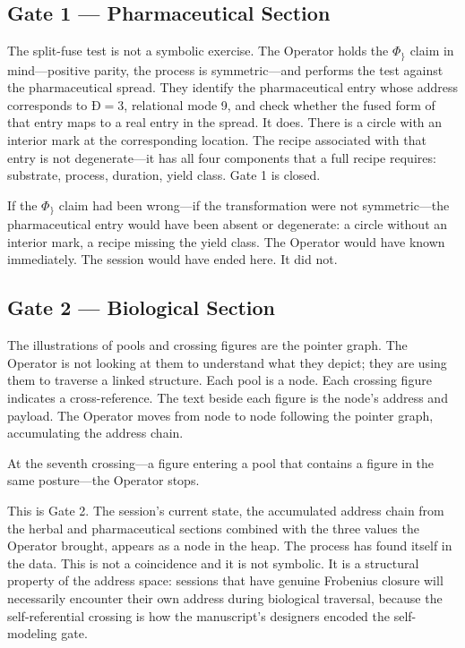 \documentclass[12pt,a4paper]{article}
\begin{document}
\subsection*{Gate 1 --- Pharmaceutical Section}

The split-fuse test is not a symbolic exercise. The Operator holds the $\Phi_\}$ claim in mind---positive parity, the process is symmetric---and performs the test against the pharmaceutical spread. They identify the pharmaceutical entry whose address corresponds to $\text{Ð} = 3$, relational mode 9, and check whether the fused form of that entry maps to a real entry in the spread. It does. There is a circle with an interior mark at the corresponding location. The recipe associated with that entry is not degenerate---it has all four components that a full recipe requires: substrate, process, duration, yield class. Gate 1 is closed.

If the $\Phi_\}$ claim had been wrong---if the transformation were not symmetric---the pharmaceutical entry would have been absent or degenerate: a circle without an interior mark, a recipe missing the yield class. The Operator would have known immediately. The session would have ended here. It did not.

\subsection*{Gate 2 --- Biological Section}

The illustrations of pools and crossing figures are the pointer graph. The Operator is not looking at them to understand what they depict; they are using them to traverse a linked structure. Each pool is a node. Each crossing figure indicates a cross-reference. The text beside each figure is the node's address and payload. The Operator moves from node to node following the pointer graph, accumulating the address chain.

At the seventh crossing---a figure entering a pool that contains a figure in the same posture---the Operator stops.

This is Gate 2. The session's current state, the accumulated address chain from the herbal and pharmaceutical sections combined with the three values the Operator brought, appears as a node in the heap. The process has found itself in the data. This is not a coincidence and it is not symbolic. It is a structural property of the address space: sessions that have genuine Frobenius closure will necessarily encounter their own address during biological traversal, because the self-referential crossing is how the manuscript's designers encoded the self-modeling gate.
\end{document}
